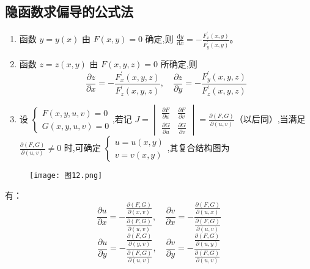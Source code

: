 \documentclass[UTF8]{ctexart}
\theoremstyle{remark}
\begin{document}
		\subsection{隐函数求偏导的公式法}
		\begin{enumerate}
			\item 函数 \(y = y(x)\) 由 \(F(x,y)=0\) 确定,则 \(\frac{\mathrm{d}y}{\mathrm{d}x}=-\frac{F_x^{\prime}(x,y)}{F_y^{\prime}(x,y)}\)。
			\item 函数 \(z = z(x,y)\) 由 \(F(x,y,z)=0\) 所确定,则
			\[
			\frac{\partial z}{\partial x}=-\frac{F_x^{\prime}(x,y,z)}{F_z^{\prime}(x,y,z)}, \quad \frac{\partial z}{\partial y}=-\frac{F_y^{\prime}(x,y,z)}{F_z^{\prime}(x,y,z)}
			\]
			\item 设 \(\begin{cases}F(x,y,u,v)=0\\G(x,y,u,v)=0\end{cases}\),若记 \(J=\begin{vmatrix}\frac{\partial F}{\partial u}&\frac{\partial F}{\partial v}\\\frac{\partial G}{\partial u}&\frac{\partial G}{\partial v}\end{vmatrix}=\frac{\partial(F,G)}{\partial(u,v)}\)（以后同）,当满足 \(\frac{\partial(F,G)}{\partial(u,v)}\neq0\) 时,可确定 \(\begin{cases}u = u(x,y)\\v = v(x,y)\end{cases}\),其复合结构图为
		\end{enumerate}
		
		\begin{figure}[h]
			\centering
			\label{fig:broadcast_communication}
			\texttt{[image: 图12.png]} %
		\end{figure}
		有：
		\[
		\frac{\partial u}{\partial x}=-\frac{\frac{\partial(F,G)}{\partial(x,v)}}{\frac{\partial(F,G)}{\partial(u,v)}}, \quad \frac{\partial v}{\partial x}=-\frac{\frac{\partial(F,G)}{\partial(u,x)}}{\frac{\partial(F,G)}{\partial(u,v)}}
		\]
		\[
		\frac{\partial u}{\partial y}=-\frac{\frac{\partial(F,G)}{\partial(y,v)}}{\frac{\partial(F,G)}{\partial(u,v)}}, \quad \frac{\partial v}{\partial y}=-\frac{\frac{\partial(F,G)}{\partial(u,y)}}{\frac{\partial(F,G)}{\partial(u,v)}}
		\]
		
\end{document}
